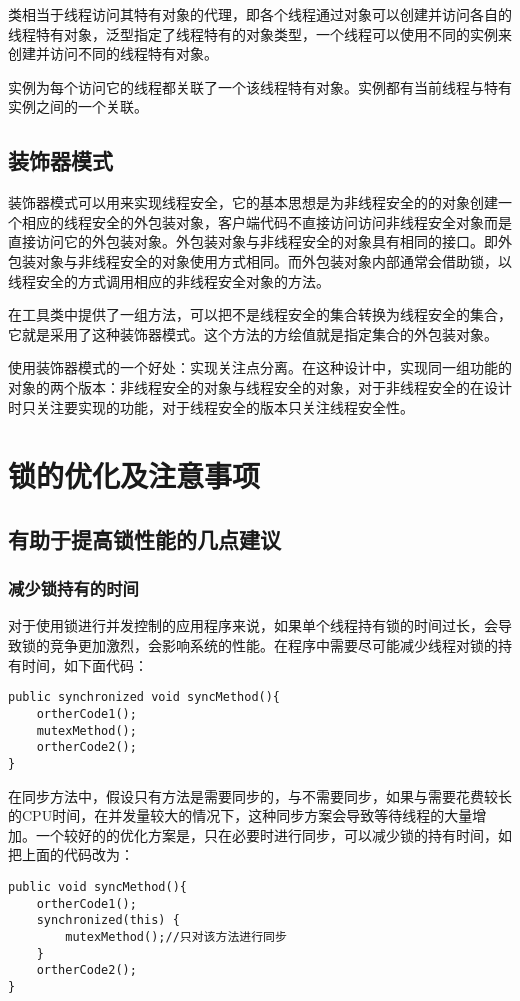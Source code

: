 \documentclass[a4paper]{report}
\begin{document}
类相当于线程访问其特有对象的代理，即各个线程通过对象可以创建并访问各自的线程特有对象，泛型指定了线程特有的对象类型，一个线程可以使用不同的实例来创建并访问不同的线程特有对象。

实例为每个访问它的线程都关联了一个该线程特有对象。实例都有当前线程与特有实例之间的一个关联。
\section{装饰器模式}
装饰器模式可以用来实现线程安全，它的基本思想是为非线程安全的的对象创建一个相应的线程安全的外包装对象，客户端代码不直接访问访问非线程安全对象而是直接访问它的外包装对象。外包装对象与非线程安全的对象具有相同的接口。即外包装对象与非线程安全的对象使用方式相同。而外包装对象内部通常会借助锁，以线程安全的方式调用相应的非线程安全对象的方法。

在工具类中提供了一组方法，可以把不是线程安全的集合转换为线程安全的集合，它就是采用了这种装饰器模式。这个方法的方绘值就是指定集合的外包装对象。

使用装饰器模式的一个好处：实现关注点分离。在这种设计中，实现同一组功能的对象的两个版本：非线程安全的对象与线程安全的对象，对于非线程安全的在设计时只关注要实现的功能，对于线程安全的版本只关注线程安全性。
\chapter{锁的优化及注意事项}
\section{有助于提高锁性能的几点建议}
\subsection{减少锁持有的时间}

对于使用锁进行并发控制的应用程序来说，如果单个线程持有锁的时间过长，会导致锁的竞争更加激烈，会影响系统的性能。在程序中需要尽可能减少线程对锁的持有时间，如下面代码：

\begin{Verbatim}[frame=single,numbersep=5pt,xleftmargin=1.5em,xrightmargin=1.5em]
public synchronized void syncMethod(){
    ortherCode1();
    mutexMethod();
    ortherCode2();
}
\end{Verbatim}
在同步方法中，假设只有方法是需要同步的，与不需要同步，如果与需要花费较长的CPU时间，在并发量较大的情况下，这种同步方案会导致等待线程的大量增加。一个较好的的优化方案是，只在必要时进行同步，可以减少锁的持有时间，如把上面的代码改为：
\begin{Verbatim}[frame=single,numbersep=5pt,xleftmargin=1.5em,xrightmargin=1.5em]
public void syncMethod(){
    ortherCode1();
    synchronized(this) {
        mutexMethod();//只对该方法进行同步
    }
    ortherCode2();
}
\end{Verbatim}
\end{document}
